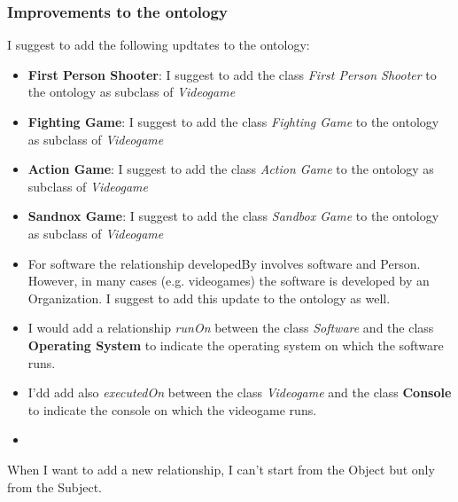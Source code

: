 \subsubsection{Improvements to the ontology}
I suggest to add the following updtates to the ontology:
\begin{itemize}
    \item \textbf{First Person Shooter}: I suggest to add the class \textit{First Person Shooter} to the ontology as subclass of \textit{Videogame}
    \item \textbf{Fighting Game}: I suggest to add the class \textit{Fighting Game} to the ontology as subclass of \textit{Videogame}
    \item \textbf{Action Game}: I suggest to add the class \textit{Action Game} to the ontology as subclass of \textit{Videogame}
    \item \textbf{Sandnox Game}: I suggest to add the class \textit{Sandbox Game} to the ontology as subclass of \textit{Videogame}
    \item For software the relationship developedBy involves software and Person. However, in many cases (e.g. videogames) the software is developed by an Organization. I suggest to add this update to the ontology as well.
    \item I would add a relationship \textit{runOn} between the class \textit{Software} and the class \textbf{Operating System} to indicate the operating system on which the software runs.
    \item I'dd add also \textit{executedOn} between the class \textit{Videogame} and the class \textbf{Console} to indicate the console on which the videogame runs.
    \item 
\end{itemize}




When I want to add a new relationship, I can't start from the Object but only from the Subject.
